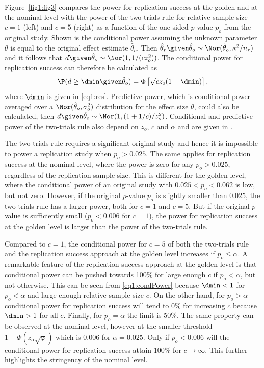 \sloppy
Figure~\ref{fig1:fig3} compares the power for replication success
\citep[see][Section 4 for details]{Held2020} at the golden and at the nominal
level with the power of the two-trials rule for relative sample size $c = 1$
(left) and $c = 5$ (right) as a function of the one-sided $p$-value $p_o$ from
the original study. Shown is the conditional power assuming the unknown
parameter $\theta$ is equal to the original effect estimate $\hat \theta_o$.
Then $\hat \theta_r \given \hat \theta_o \sim \Nor(\hat \theta_o, \kappa^2/n_r)$
and it follows that $d \given \hat \theta_o \sim \Nor(1, 1/(c z_o^2))$. The
conditional power for replication success can therefore be calculated as
\begin{equation}\label{eq1:condPower}
\P(d \geq \dmin \given \hat \theta_o) = \Phi\left[\sqrt{c} z_o (1-\dmin)\right],
\end{equation}
where $\dmin$ is given in \eqref{eq1:res}. Predictive power, which is
conditional power averaged over a \mbox{$\Nor(\hat \theta_o, \sigma_o^2)$}
distribution for the effect size $\theta$, could also be calculated, then
\mbox{$d \given \hat \theta_o \sim \Nor(1, (1+1/c)/z_o^2)$}. Conditional and
predictive power of the two-trials rule also depend on $z_o$, $c$ and $\alpha$
and are given in \citet{Micheloud2020}.

The two-trials rule requires a significant original study and hence it is
impossible to power a replication study when $p_o > 0.025$. The same applies for
replication success at the nominal level, where the power is zero for any
$p_o > 0.025$, regardless of the replication sample size. This is different for
the golden level, where the conditional power of an original study with
$0.025 < p_o < 0.062$ is low, but not zero. However, if the original $p$-value
$p_o$ is slightly smaller than $0.025$, the two-trials rule has a larger power,
both for $c=1$ and $c=5$. But if the original $p$-value is sufficiently small
($p_o < 0.006$ for $c=1$), the power for replication success at the golden level
is larger than the power of the two-trials rule.


Compared to $c=1$, the conditional power for $c=5$ of both the two-trials rule
and the replication success approach at the golden level increases if
$p_o \leq \alpha$. A remarkable feature of the replication success approach at
the golden level is that conditional power can be pushed towards 100\% for large
enough $c$ if $p_o<\alpha$, but not otherwise. This can be seen from
\eqref{eq1:condPower} because $\dmin < 1$ for $p_o<\alpha$ and large enough
relative sample size $c$. On the other hand, for $p_o > \alpha$ conditional
power for replication success will tend to 0\% for increasing $c$ because
$\dmin>1$ for all $c$. Finally, for $p_o = \alpha$ the limit is 50\%. The same
property can be observed at the nominal level, however at the smaller threshold
$1-\Phi(z_\alpha \sqrt{\varphi})$ which is $0.006$ for $\alpha=0.025$. Only if
$p_o < 0.006$ will the conditional power for replication success attain 100\%
for $c \to \infty$. This further highlights the stringency of the nominal level.

